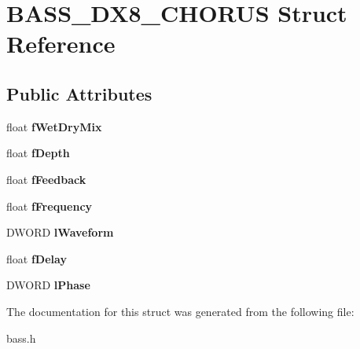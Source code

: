 \section{B\+A\+S\+S\+\_\+\+D\+X8\+\_\+\+C\+H\+O\+R\+U\+S Struct Reference}
\label{struct_b_a_s_s___d_x8___c_h_o_r_u_s}
\subsection*{Public Attributes}
\begin{DoxyCompactItemize}
\item 
float {\bfseries f\+Wet\+Dry\+Mix}\label{struct_b_a_s_s___d_x8___c_h_o_r_u_s_ade39ce1bf6ab4e1e4ae192491cf61dd9}

\item 
float {\bfseries f\+Depth}\label{struct_b_a_s_s___d_x8___c_h_o_r_u_s_a9255f6285c268622c30999d684e428f5}

\item 
float {\bfseries f\+Feedback}\label{struct_b_a_s_s___d_x8___c_h_o_r_u_s_a3bbcdaa3f0e076111a62e6d9d10b77a8}

\item 
float {\bfseries f\+Frequency}\label{struct_b_a_s_s___d_x8___c_h_o_r_u_s_a6c28b947dcc6053c08694699625a705f}

\item 
D\+W\+O\+R\+D {\bfseries l\+Waveform}\label{struct_b_a_s_s___d_x8___c_h_o_r_u_s_ada4ac1a08de4b20c7344d6a28d04a755}

\item 
float {\bfseries f\+Delay}\label{struct_b_a_s_s___d_x8___c_h_o_r_u_s_a009967698b28066520e72e3db35a57b3}

\item 
D\+W\+O\+R\+D {\bfseries l\+Phase}\label{struct_b_a_s_s___d_x8___c_h_o_r_u_s_a98b93f86df1f31303a62c5942ebe3c0e}

\end{DoxyCompactItemize}


The documentation for this struct was generated from the following file\+:\begin{DoxyCompactItemize}
\item 
bass.\+h\end{DoxyCompactItemize}
